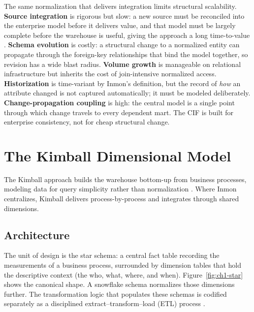 The same normalization that delivers integration limits structural scalability. \textbf{Source integration} is rigorous but slow: a new source must be reconciled into the enterprise model before it delivers value, and that model must be largely complete before the warehouse is useful, giving the approach a long time-to-value \parencite{inmon2005, golfarelli2009}. \textbf{Schema evolution} is costly: a structural change to a normalized entity can propagate through the foreign-key relationships that bind the model together, so revision has a wide blast radius. \textbf{Volume growth} is manageable on relational infrastructure but inherits the cost of join-intensive normalized access. \textbf{Historization} is time-variant by Inmon's definition, but the record of \textit{how} an attribute changed is not captured automatically; it must be modeled deliberately. \textbf{Change-propagation coupling} is high: the central model is a single point through which change travels to every dependent mart. The CIF is built for enterprise consistency, not for cheap structural change.

\section{The Kimball Dimensional Model}
\label{sec:ch1-kimball}

The Kimball approach builds the warehouse bottom-up from business processes, modeling data for query simplicity rather than normalization \parencite{kimball2013}. Where Inmon centralizes, Kimball delivers process-by-process and integrates through shared dimensions.

\subsection{Architecture}
\label{subsec:ch1-kimball-arch}

The unit of design is the star schema: a central fact table recording the measurements of a business process, surrounded by dimension tables that hold the descriptive context (the who, what, where, and when). Figure~\ref{fig:ch1-star} shows the canonical shape. A snowflake schema normalizes those dimensions further. The transformation logic that populates these schemas is codified separately as a disciplined extract--transform--load (ETL) process \parencite{kimball2004etl, vassiliadis2009}.

